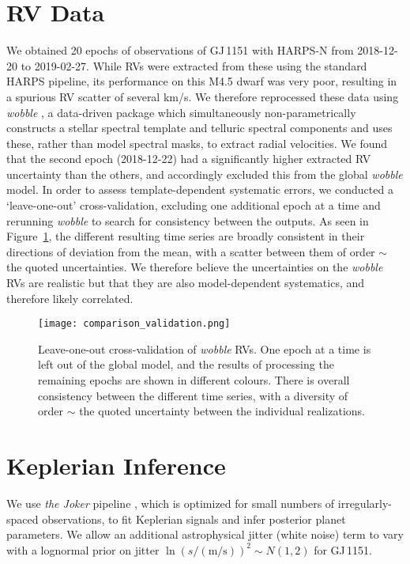 \documentclass[modern]{aastex62}
\begin{document}
\section{RV Data}
\label{sec:k2}

We obtained 20 epochs of observations of GJ\,1151 with HARPS-N from 2018-12-20 to 2019-02-27. While RVs were extracted from these using the standard HARPS pipeline, its performance on this M4.5 dwarf was very poor, resulting in a spurious RV scatter of several km/s. We therefore reprocessed these data using \textit{wobble} \citep{wobble}, a data-driven package which simultaneously non-parametrically constructs a stellar spectral template and telluric spectral components and uses these, rather than model spectral masks, to extract radial velocities. We found that the second epoch (2018-12-22) had a significantly higher extracted RV uncertainty than the others, and accordingly excluded this from the global \textit{wobble} model. In order to assess template-dependent systematic errors, we conducted a `leave-one-out' cross-validation, excluding one additional epoch at a time and rerunning \textit{wobble} to search for consistency between the outputs. As seen in Figure~\ref{xvalidation}, the different resulting time series are broadly consistent in their directions of deviation from the mean, with a scatter between them of order $\sim$ the quoted uncertainties. We therefore believe the uncertainties on the \textit{wobble} RVs are realistic but that they are also model-dependent systematics, and therefore likely correlated. 


\begin{figure}
\noindent\texttt{[image: comparison\_validation.png]}

\caption{\label{xvalidation}
Leave-one-out cross-validation of \textit{wobble} RVs. One epoch at a time is left out of the global model, and the results of processing the remaining epochs are shown in different colours. There is overall consistency between the different time series, with a diversity of order $\sim$ the quoted uncertainty between the individual realizations. %
}
\end{figure}

\section{Keplerian Inference}
\label{sec:joker}

We use \textit{the Joker} pipeline \citep{joker}, which is optimized for small numbers of irregularly-spaced observations, to fit Keplerian signals and infer posterior planet parameters. We allow an additional astrophysical jitter (white noise) term to vary with a lognormal prior on jitter $\ln {(s/(\text{m/s}))^2} \sim {N}(1,2)$ for GJ\,1151.
\end{document}
